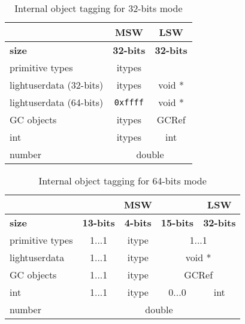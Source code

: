 \begin{table}[H]
\centering
\caption{Internal object tagging for 32-bits mode}
\label{tab:tagged-gc32}
\begin{tabular}{l|c|c|c|}
\cline{2-4}
                                              & \multicolumn{2}{c|}{\textbf{MSW}}         & \textbf{LSW}         \\ \hline
\multicolumn{1}{|l|}{\textbf{size}}                    & \multicolumn{2}{c|}{\textbf{32-bits}}     & \textbf{32-bits}     \\ \hline
\multicolumn{1}{|l|}{primitive types}         & \multicolumn{2}{c|}{itypes}      &             \\ \hline
\multicolumn{1}{|l|}{lightuserdata (32-bits)} & \multicolumn{2}{c|}{itypes}      & void *      \\ \hline
\multicolumn{1}{|l|}{lightuserdata (64-bits)} & \multicolumn{2}{c|}{\texttt{0xffff}}           & void * \\ \hline
\multicolumn{1}{|l|}{GC objects}              & \multicolumn{2}{c|}{itypes}      & GCRef       \\ \hline
\multicolumn{1}{|l|}{int}                     & \multicolumn{2}{c|}{itypes}      & int         \\ \hline
\multicolumn{1}{|l|}{number}                  & \multicolumn{3}{c|}{double}                    \\ \hline
\end{tabular}
\end{table}



\begin{table}[H]
\centering
\caption{Internal object tagging for 64-bits mode}
\label{tab:tagged-gc64}
\begin{tabular}{l|c|c|c|c|}
\cline{2-5}
                                      & \multicolumn{3}{c|}{\textbf{MSW}}         & \textbf{LSW}         \\ \hline
\multicolumn{1}{|l|}{\textbf{size}}            & \textbf{13-bits} & \textbf{4-bits} & \textbf{15-bits}       & \textbf{32-bits}     \\ \hline
\multicolumn{1}{|l|}{primitive types} & 1...1   & itype  & \multicolumn{2}{c|}{1...1}  \\ \hline
\multicolumn{1}{|l|}{lightuserdata}   & 1...1   & itype  & \multicolumn{2}{c|}{void *} \\ \hline
\multicolumn{1}{|l|}{GC objects}      & 1...1   & itype  & \multicolumn{2}{c|}{GCRef}  \\ \hline
\multicolumn{1}{|l|}{int}             & 1...1   & itype  & 0...0         & int         \\ \hline
\multicolumn{1}{|l|}{number}          & \multicolumn{4}{c|}{double}                    \\ \hline
\end{tabular}
\end{table}

